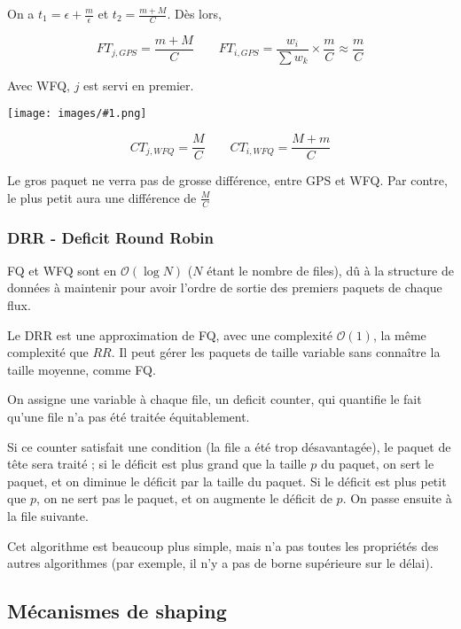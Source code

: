 \documentclass[10pt,a4paper]{report}
\newcommand{\dessinS}[2]{\begin{center}\texttt{[image: images/\#1.png]}\end{center}}
\begin{document}
			On a $t_1 = \epsilon + \frac{m}{\epsilon}$ et $t_2 = \frac{m + M}{C}$. Dès lors,
			
			$$FT_{j, GPS} = \frac{m + M}{C} \quad \quad FT_{i, GPS} = \frac{w_i}{\sum w_k} \times \frac{m}{C} \approx \frac{m}{C}$$
		
		
		
			Avec WFQ, $j$ est servi en premier.
		
			\dessinS{101}{.65}
			
			$$CT_{j, WFQ} = \frac{M}{C} \quad \quad CT_{i, WFQ} = \frac{M + m}{C}$$
			
			
			Le gros paquet ne verra pas de grosse différence, entre GPS et WFQ. Par contre, le plus petit aura une différence de $ \frac{M}{C} $
			
			\subsubsection{DRR - Deficit Round Robin}
			
			FQ et WFQ sont en $\mathcal{O}(\log N)$ ($N$ étant le nombre de files), dû à la structure de données à maintenir pour avoir l'ordre de sortie des premiers paquets de chaque flux.%
			
			Le DRR est une approximation de FQ, avec une complexité $\mathcal{O}(1)$, la même complexité que $RR$. Il peut gérer les paquets de taille variable sans connaître la taille moyenne, comme FQ.
			
			On assigne une variable à chaque file, un deficit counter, qui quantifie le fait qu'une file n'a pas été traitée équitablement. 
			
			Si ce counter satisfait une condition (la file a été trop désavantagée), le paquet de tête sera traité ; si le déficit est plus grand que la taille $p$ du paquet, on sert le paquet, et on diminue le déficit par la taille du paquet. Si le déficit est plus petit que $p$, on ne sert pas le paquet, et on augmente le déficit de $p$. On passe ensuite à la file suivante.			
			
			
			Cet algorithme est beaucoup plus simple, mais n'a pas toutes les propriétés des autres algorithmes (par exemple, il n'y a pas de borne supérieure sur le délai).
		
		\subsection{Mécanismes de shaping}
		
\end{document}
